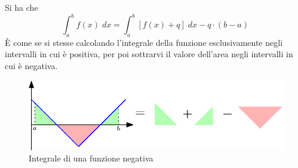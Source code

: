 \documentclass[10pt, letterpaper]{report}
\begin{document}
Si ha che 
$$ 
 \int_a^b f(x)\;dx =  \int_a^b [f(x)+q]\;dx-q\cdot(b-a) 
$$
È come se si stesse calcolando l'integrale della funzione esclusivamente negli intervalli in cui 
è positiva, per poi sottrarvi il valore dell'area negli intervalli in cui è negativa. 
\begin{figure}[h!]
    \centering
    \includegraphics[width=350pt ]{images/areaNeg.eps}
    \caption{Integrale di una funzione negativa}
    \label{fig:areaNeg}
\end{figure}
\end{document}
